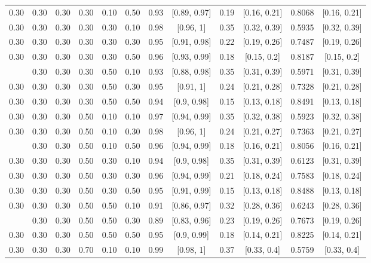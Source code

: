 \documentclass[
  11pt,
]{article}
\begin{document}
\begin{landscape}
\begin{ThreePartTable}
\begin{longtable}[t]{cccccccccccc}
0.30 & 0.30 & 0.30 & 0.30 & 0.10 & 0.50 & 0.93 & {}[0.89, 0.97] & 0.19 & {}[0.16, 0.21] & 0.8068 & {}[0.16, 0.21]\\
0.30 & 0.30 & 0.30 & 0.30 & 0.30 & 0.10 & 0.98 & {}[0.96, 1] & 0.35 & {}[0.32, 0.39] & 0.5935 & {}[0.32, 0.39]\\
0.30 & 0.30 & 0.30 & 0.30 & 0.30 & 0.30 & 0.95 & {}[0.91, 0.98] & 0.22 & {}[0.19, 0.26] & 0.7487 & {}[0.19, 0.26]\\
0.30 & 0.30 & 0.30 & 0.30 & 0.30 & 0.50 & 0.96 & {}[0.93, 0.99] & 0.18 & {}[0.15, 0.2] & 0.8187 & {}[0.15, 0.2]\\
\addlinespace
0.30 & 0.30 & 0.30 & 0.30 & 0.50 & 0.10 & 0.93 & {}[0.88, 0.98] & 0.35 & {}[0.31, 0.39] & 0.5971 & {}[0.31, 0.39]\\
0.30 & 0.30 & 0.30 & 0.30 & 0.50 & 0.30 & 0.95 & {}[0.91, 1] & 0.24 & {}[0.21, 0.28] & 0.7328 & {}[0.21, 0.28]\\
0.30 & 0.30 & 0.30 & 0.30 & 0.50 & 0.50 & 0.94 & {}[0.9, 0.98] & 0.15 & {}[0.13, 0.18] & 0.8491 & {}[0.13, 0.18]\\
0.30 & 0.30 & 0.30 & 0.50 & 0.10 & 0.10 & 0.97 & {}[0.94, 0.99] & 0.35 & {}[0.32, 0.38] & 0.5923 & {}[0.32, 0.38]\\
0.30 & 0.30 & 0.30 & 0.50 & 0.10 & 0.30 & 0.98 & {}[0.96, 1] & 0.24 & {}[0.21, 0.27] & 0.7363 & {}[0.21, 0.27]\\
\addlinespace
0.30 & 0.30 & 0.30 & 0.50 & 0.10 & 0.50 & 0.96 & {}[0.94, 0.99] & 0.18 & {}[0.16, 0.21] & 0.8056 & {}[0.16, 0.21]\\
0.30 & 0.30 & 0.30 & 0.50 & 0.30 & 0.10 & 0.94 & {}[0.9, 0.98] & 0.35 & {}[0.31, 0.39] & 0.6123 & {}[0.31, 0.39]\\
0.30 & 0.30 & 0.30 & 0.50 & 0.30 & 0.30 & 0.96 & {}[0.94, 0.99] & 0.21 & {}[0.18, 0.24] & 0.7583 & {}[0.18, 0.24]\\
0.30 & 0.30 & 0.30 & 0.50 & 0.30 & 0.50 & 0.95 & {}[0.91, 0.99] & 0.15 & {}[0.13, 0.18] & 0.8488 & {}[0.13, 0.18]\\
0.30 & 0.30 & 0.30 & 0.50 & 0.50 & 0.10 & 0.91 & {}[0.86, 0.97] & 0.32 & {}[0.28, 0.36] & 0.6243 & {}[0.28, 0.36]\\
\addlinespace
0.30 & 0.30 & 0.30 & 0.50 & 0.50 & 0.30 & 0.89 & {}[0.83, 0.96] & 0.23 & {}[0.19, 0.26] & 0.7673 & {}[0.19, 0.26]\\
0.30 & 0.30 & 0.30 & 0.50 & 0.50 & 0.50 & 0.95 & {}[0.9, 0.99] & 0.18 & {}[0.14, 0.21] & 0.8225 & {}[0.14, 0.21]\\
0.30 & 0.30 & 0.30 & 0.70 & 0.10 & 0.10 & 0.99 & {}[0.98, 1] & 0.37 & {}[0.33, 0.4] & 0.5759 & {}[0.33, 0.4]\\

\end{longtable}
\end{ThreePartTable}
\end{landscape}
\end{document}
